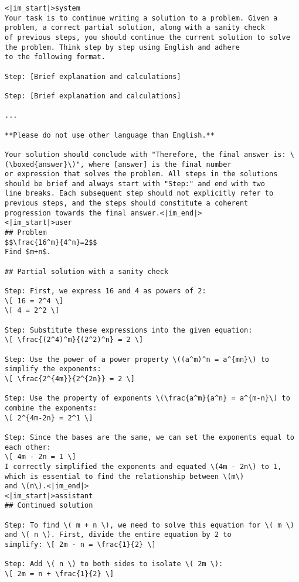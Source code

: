 \begin{tcolorbox}[brown_box, title = {{Prompt Template 1.2.1 --- Generator generates continuations for correct partial solutions}}]\tiny
\begin{verbatim}
<|im_start|>system
Your task is to continue writing a solution to a problem. Given a problem, a correct partial solution, along with a sanity check
of previous steps, you should continue the current solution to solve the problem. Think step by step using English and adhere 
to the following format.

Step: [Brief explanation and calculations]

Step: [Brief explanation and calculations]

...

**Please do not use other language than English.**

Your solution should conclude with "Therefore, the final answer is: \(\boxed{answer}\)", where [answer] is the final number
or expression that solves the problem. All steps in the solutions should be brief and always start with "Step:" and end with two
line breaks. Each subsequent step should not explicitly refer to previous steps, and the steps should constitute a coherent 
progression towards the final answer.<|im_end|>
<|im_start|>user
## Problem
$$\frac{16^m}{4^n}=2$$
Find $m+n$.

## Partial solution with a sanity check

Step: First, we express 16 and 4 as powers of 2:
\[ 16 = 2^4 \]
\[ 4 = 2^2 \]

Step: Substitute these expressions into the given equation:
\[ \frac{(2^4)^m}{(2^2)^n} = 2 \]

Step: Use the power of a power property \((a^m)^n = a^{mn}\) to simplify the exponents:
\[ \frac{2^{4m}}{2^{2n}} = 2 \]

Step: Use the property of exponents \(\frac{a^m}{a^n} = a^{m-n}\) to combine the exponents:
\[ 2^{4m-2n} = 2^1 \]

Step: Since the bases are the same, we can set the exponents equal to each other:
\[ 4m - 2n = 1 \]
I correctly simplified the exponents and equated \(4m - 2n\) to 1, which is essential to find the relationship between \(m\)
and \(n\).<|im_end|>
<|im_start|>assistant
## Continued solution

Step: To find \( m + n \), we need to solve this equation for \( m \) and \( n \). First, divide the entire equation by 2 to 
simplify: \[ 2m - n = \frac{1}{2} \]

Step: Add \( n \) to both sides to isolate \( 2m \):
\[ 2m = n + \frac{1}{2} \]


\end{verbatim}
\end{tcolorbox}
